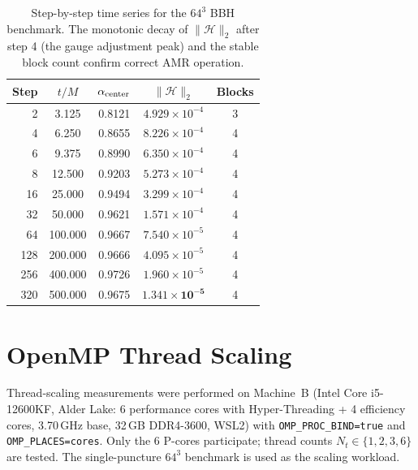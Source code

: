 \documentclass[aps,prd,twocolumn,superscriptaddress,nofootinbib,showpacs,
               longbibliography]{revtex4-2}
\newcommand{\code}[1]{\texttt{#1}}
\newcommand{\norm}[1]{\|#1\|}
\begin{document}
\begin{table}[t]
\caption{Step-by-step time series for the $64^3$ BBH benchmark.
  The monotonic decay of $\norm{\mathcal{H}}_2$ after step 4 (the gauge
  adjustment peak) and the stable block count confirm correct AMR operation.}
\label{tab:bbh_timeseries}
\begin{ruledtabular}
\begin{tabular}{rcccc}
  Step & $t/M$ & $\alpha_{\rm center}$ & $\norm{\mathcal{H}}_2$ & Blocks \\ \hline
     2 &   3.125 & 0.8121 & $4.929\times10^{-4}$ & 3 \\
     4 &   6.250 & 0.8655 & $8.226\times10^{-4}$ & 4 \\
     6 &   9.375 & 0.8990 & $6.350\times10^{-4}$ & 4 \\
     8 &  12.500 & 0.9203 & $5.273\times10^{-4}$ & 4 \\
    16 &  25.000 & 0.9494 & $3.299\times10^{-4}$ & 4 \\
    32 &  50.000 & 0.9621 & $1.571\times10^{-4}$ & 4 \\
    64 & 100.000 & 0.9667 & $7.540\times10^{-5}$ & 4 \\
   128 & 200.000 & 0.9666 & $4.095\times10^{-5}$ & 4 \\
   256 & 400.000 & 0.9726 & $1.960\times10^{-5}$ & 4 \\
   320 & 500.000 & 0.9675 & $\mathbf{1.341\times10^{-5}}$ & 4 \\
\end{tabular}
\end{ruledtabular}
\end{table}

\section{OpenMP Thread Scaling}
\label{sec:scaling}

Thread-scaling measurements were performed on Machine~B (Intel Core
i5-12600KF, Alder Lake: 6 performance cores with Hyper-Threading + 4
efficiency cores, 3.70\,GHz base, 32\,GB DDR4-3600, WSL2) with
\code{OMP\_PROC\_BIND=true} and \code{OMP\_PLACES=cores}.
Only the 6 P-cores participate; thread counts $N_t \in \{1,2,3,6\}$ are tested.
The single-puncture $64^3$ benchmark is used as the scaling workload.
\end{document}
